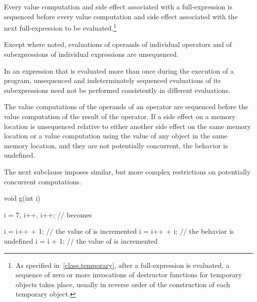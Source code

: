 \pnum
Every
%
value computation and
%
side effect associated with a full-expression is
sequenced before every value computation and side effect associated with the
next full-expression to be evaluated.\footnote{As specified
in~\ref{class.temporary}, after a full-expression is evaluated, a sequence of
zero or more invocations of destructor functions for temporary objects takes
place, usually in reverse order of the construction of each temporary object.}

\pnum
{}%
Except where noted, evaluations of operands of individual operators and
of subexpressions of individual expressions are unsequenced.
\begin{note}
In an expression that is evaluated more than once during the execution
of a program, unsequenced and indeterminately sequenced evaluations of
its subexpressions need not be performed consistently in different
evaluations.
\end{note}
The value computations of the operands of an
operator are sequenced before the value computation of the result of the
operator. If a
%
side effect on a memory location is unsequenced
relative to either another side effect on the same memory location or
a value computation using the value of any object in the same memory location,
and they are not potentially concurrent,
the behavior is undefined.
\begin{note}
The next subclause imposes similar, but more complex restrictions on
potentially concurrent computations.
\end{note}

\begin{example}
\begin{codeblock}
void g(int i) {
  i = 7, i++, i++;              //  becomes 

  i = i++ + 1;                  // the value of  is incremented
  i = i++ + i;                  // the behavior is undefined
  i = i + 1;                    // the value of  is incremented
}
\end{codeblock}
\end{example}

